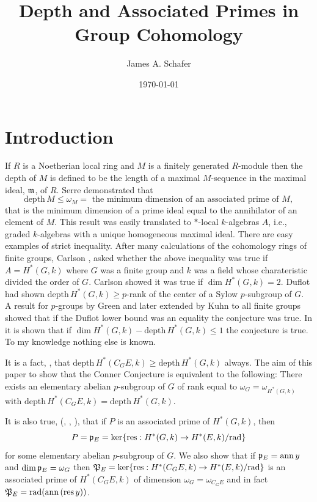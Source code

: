 \documentclass[reqno]{amsart}
\title{Depth and Associated Primes in Group Cohomology}
\author{James A. Schafer}
\date{\today}
\theoremstyle{plain}%
\theoremstyle{definition}
\theoremstyle{remark}
\newcommand\dph{\text{depth}\,}
\newcommand\an{\text{ann}\,}
\newcommand\fg{finitely generated }
\newcommand\res{\text{res}}
\begin{document}
\maketitle




\section*{Introduction} If $R$ is a Noetherian local ring and $M$ is a \fg $R$-module then the depth of $M$ is defined to be the length of a maximal $M$-sequence in the maximal ideal, $\frak m$, of $R$.  Serre demonstrated that $$\dph M\leq \omega_M=\text{ the minimum dimension of an associated prime of } M,$$ that is the minimum dimension of a prime ideal equal to the annihilator of an element of $M$.  This result was easily translated to $*$-local $k$-algebras $A$, i.e., graded $k$-algebras with a unique homogeneous maximal ideal.  There are easy examples of strict inequality. After many calculations of the cohomology rings of finite groups, Carlson \cite{C}, asked whether the above inequality was true if $A=H^*(G,k)$ where $G$ was a finite group and $k$ was a field whose charateristic divided the order of $G$.  Carlson showed it was true if $\dim H^*(G,k)=2$. Duflot \cite{D} had shown $\dph H^*(G,k)\geq p$-rank of the center of a Sylow $p$-subgroup of $G$. A result for $p$-groups by Green \cite{G} and later extended by Kuhn \cite{K} to all finite groups showed that if the Duflot lower bound was an equality the conjecture was true.  In \cite{S} it is shown that if $\dim H^*(G,k)-\dph H^*(G,k)\leq 1$ the conjecture is true. To my knowledge nothing else is known.

It is a fact, \cite{N}, that $\dph H^*(C_GE,k)\geq\dph H^*(G,k)$ always. The aim of this paper to show that the Conner Conjecture is equivalent to the following: There exists an elementary abelian $p$-subgroup of $G$ of rank equal to $\omega_G=\omega_{H^*(G,k)}$ with $\dph H^*(C_GE,k)=\dph H^*(G,k)$.

It is also true, (\cite{B1}, \cite{Se}, \cite{W}), that if $P$ is an associated prime of $H^*(G,k)$, then
$$P=\frak p_E=\ker\{\res:H^*(G,k)\to H^*(E,k)/\text{rad}\}$$ for some elementary abelian $p$-subgroup of $G$.   We also show that if $\frak p_E=\an y$ and $\dim \frak p_E=\omega_G$ then $\frak P_E=\ker\{\res:H^*(C_GE,k)\to H^*(E,k)/\text{rad}\}$ is an associated prime of $H^*(C_GE,k)$ of dimension $\omega_G=\omega_{C_GE}$ and in fact $\frak P_E=\text{rad}(\an(\res\, y))$.
\end{document}
